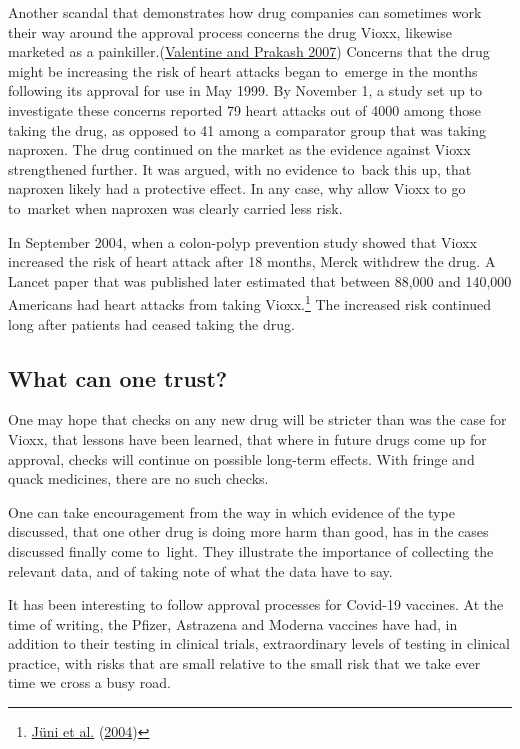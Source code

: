 \documentclass[
  10pt,
  b5paper]{book}
\begin{document}
Another scandal that demonstrates how drug companies can
sometimes work their way around the approval process
concerns the drug Vioxx, likewise marketed as a
painkiller.(\protect\hyperlink{ref-valentine2007timeline}{Valentine and Prakash 2007}) Concerns that the
drug might be increasing the risk of heart attacks began
to~emerge in the months following its approval for use
in May 1999. By November 1, a study set up to investigate
these concerns reported 79 heart attacks out of 4000
among those taking the drug, as opposed to 41 among a
comparator group that was taking naproxen. The drug
continued on the market as the evidence against Vioxx
strengthened further. It was argued, with no evidence
to~back this up, that naproxen likely had a protective
effect. In any case, why allow Vioxx to go to~market
when naproxen was clearly carried less risk.

In September 2004,
when a colon-polyp prevention study showed that Vioxx
increased the risk of heart attack after 18 months,
Merck withdrew the drug. A Lancet paper that was
published later estimated that between 88,000 and
140,000 Americans had heart attacks from taking
Vioxx.\footnote{\protect\hyperlink{ref-juni2004risk}{Jüni et al.} (\protect\hyperlink{ref-juni2004risk}{2004})} The increased risk continued
long after patients had ceased taking the drug.

\hypertarget{what-can-one-trust}{%
\subsection*{What can one trust?}\label{what-can-one-trust}}

One may hope that checks on any new drug will be
stricter than was the case for Vioxx, that lessons
have been learned, that where in future drugs come
up for approval, checks will continue on possible
long-term effects. With fringe and quack medicines,
there are no such checks.

One can take encouragement from the way in which
evidence of the type discussed, that one other drug
is doing more harm than good, has in the cases
discussed finally come to~light. They illustrate
the importance of collecting the relevant data, and
of taking note of what the data have to say.

It has been interesting to follow approval processes
for Covid-19 vaccines. At the time of writing, the
Pfizer, Astrazena and Moderna vaccines have had, in
addition to their testing in clinical trials,
extraordinary levels of testing in clinical practice,
with risks that are small relative to the small risk
that we take ever time we cross a busy road.
\end{document}
